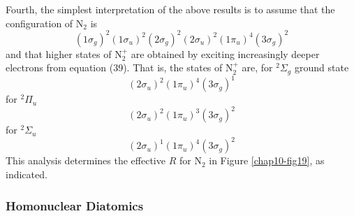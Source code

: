 Fourth, the simplest interpretation of the above results is to assume 
that the configuration of N$_2$ is
\begin{equation}
( 1 \sigma_g )^2 ( 1 \sigma_u )^2 ( 2 \sigma_g )^2
( 2 \sigma_u )^2 ( 1 \pi_u )^4 ( 3 \sigma_g )^2
\label{chap10-eqno39}
\end{equation}
and that higher states of N$_2^+$ are obtained by exciting increasingly
deeper electrons from equation (39).  That is, the states of N$_2^+$ are, for
${^2\Sigma}_g$ ground state
\begin{equation}
( 2 \sigma_u )^2 ( 1 \pi_u )^4 ( 3 \sigma_g )^1
\end{equation}
for ${^2\Pi}_u$
\begin{equation}
( 2 \sigma_u )^2 (  1 \pi_u )^3 ( 3 \sigma_g )^2
\end{equation}
for ${^2\Sigma}_u$
\begin{equation}
( 2 \sigma_u )^1 ( 1 \pi_u )^4 ( 3 \sigma_g )^2
\end{equation}
This analysis determines the effective $R$ for N$_2$ in Figure
\ref{chap10-fig19}, as indicated.

\subsubsection{Homonuclear Diatomics}

